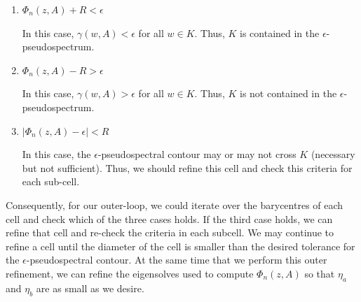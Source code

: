 \documentclass[12pt,a4paper]{article}
\theoremstyle{boldthm}
\theoremstyle{bolddefn}
\begin{document}
\begin{enumerate}[label=\textbf{Case \arabic*}]

\item $\Phi_n(z,A) + R < \epsilon$

    In this case, $\gamma(w, A) < \epsilon$ for all $w \in K.$ Thus, $K$ is contained in the $\epsilon$-pseudospectrum.
    
\item $\Phi_n(z,A) - R > \epsilon$

    In this case, $\gamma(w, A) > \epsilon$ for all $w \in K.$ Thus, $K$ is not contained in the $\epsilon$-pseudospectrum.
    
\item $|\Phi_n(z,A) - \epsilon| < R$

    In this case, the $\epsilon$-pseudospectral contour may or may not cross $K$ (necessary but not sufficient). Thus, we should refine this cell and check this criteria for each sub-cell. 
\end{enumerate}

Consequently, for our outer-loop, we could iterate over the barycentres of each cell and check which of the three cases holds. If the third case holds, we can refine that cell and re-check the criteria in each subcell. We may continue to refine a cell until the diameter of the cell is smaller than the desired tolerance for the $\epsilon$-pseudospectral contour. At the same time that we perform this outer refinement, we can refine the eigensolves used to compute $\Phi_n(z, A)$ so that $\eta_a$ and $\eta_b$ are as small as we desire. 
    
    
    
\end{document}
